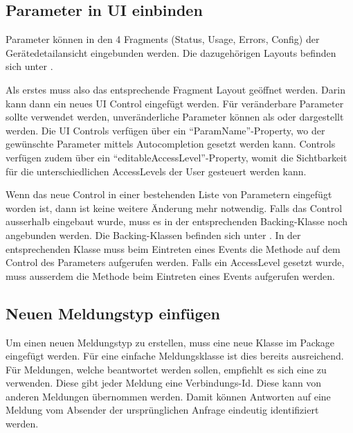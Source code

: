 \subsection{Parameter in UI einbinden}
\label{sub:parameter_einbinden}
Parameter können in den 4 Fragments (Status, Usage, Errors, Config) der Gerätedetailansicht eingebunden werden. Die dazugehörigen Layouts befinden sich unter .

Als erstes muss also das entsprechende Fragment Layout geöffnet werden. Darin kann dann ein neues UI Control eingefügt werden. Für veränderbare Parameter sollte  verwendet werden, unveränderliche Parameter können als  oder  dargestellt werden. Die UI Controls verfügen über ein \enquote{ParamName}-Property, wo der gewünschte Parameter mittels Autocompletion gesetzt werden kann.  Controls verfügen zudem über ein \enquote{editableAccessLevel}-Property, womit die Sichtbarkeit für die unterschiedlichen AccessLevels der User gesteuert werden kann.

Wenn das neue Control in einer bestehenden Liste von Parametern eingefügt worden ist, dann ist keine weitere Änderung mehr notwendig. Falls das Control ausserhalb eingebaut wurde, muss es in der entsprechenden Backing-Klasse noch angebunden werden. Die Backing-Klassen befinden sich unter . In der entsprechenden Klasse muss beim Eintreten eines  Events die Methode  auf dem Control des Parameters aufgerufen werden. Falls ein AccessLevel gesetzt wurde, muss ausserdem die Methode  beim Eintreten eines  Events aufgerufen werden.

\subsection{Neuen Meldungstyp einfügen}
Um einen neuen Meldungstyp zu erstellen, muss eine neue Klasse im Package  eingefügt werden. Für eine einfache Meldungsklasse ist dies bereits ausreichend. Für Meldungen, welche beantwortet werden sollen, empfiehlt es sich eine  zu verwenden. Diese gibt jeder Meldung eine Verbindungs-Id. Diese kann von anderen Meldungen übernommen werden. Damit können Antworten auf eine Meldung vom Absender der ursprünglichen Anfrage eindeutig identifiziert werden.

